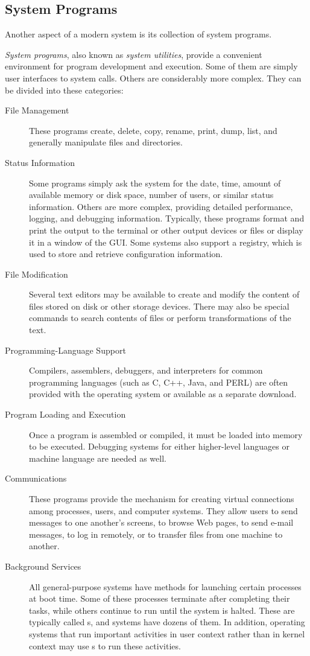 \subsection{System Programs}\label{subsec:System_Programs}
Another aspect of a modern system is its collection of system programs.
\begin{definition}\label{def:System_Program}
  \emph{System programs}, also known as \emph{system utilities}, provide a convenient environment for program development and execution.
  Some of them are simply user interfaces to system calls.
  Others are considerably more complex.
  They can be divided into these categories:
  \begin{description}
  \item[File Management] These programs create, delete, copy, rename, print, dump, list, and generally manipulate files and directories.
  \item[Status Information] Some programs simply ask the system for the date, time, amount of available memory or disk space, number of users, or similar status information.
    Others are more complex, providing detailed performance, logging, and debugging information.
    Typically, these programs format and print the output to the terminal or other output devices or files or display it in a window of the GUI.\@
    Some systems also support a registry, which is used to store and retrieve configuration information.
  \item[File Modification] Several text editors may be available to create and modify the content of files stored on disk or other storage devices.
    There may also be special commands to search contents of files or perform transformations of the text.
  \item[Programming-Language Support] Compilers, assemblers, debuggers, and interpreters for common programming languages (such as C, C++, Java, and PERL) are often provided with the operating system or available as a separate download.
  \item[Program Loading and Execution] Once a program is assembled or compiled, it must be loaded into memory to be executed.
    Debugging systems for either higher-level languages or machine language are needed as well.
  \item[Communications] These programs provide the mechanism for creating virtual connections among processes, users, and computer systems.
    They allow users to send messages to one another’s screens, to browse Web pages, to send e-mail messages, to log in remotely, or to transfer files from one machine to another.
  \item[Background Services] All general-purpose systems have methods for launching certain  processes at boot time.
    Some of these processes terminate after completing their tasks, while others continue to run until the system is halted.
    These are typically called s, and systems have dozens of them.
    In addition, operating systems that run important activities in user context rather than in kernel context may use s to run these activities.
  \end{description}
\end{definition}

